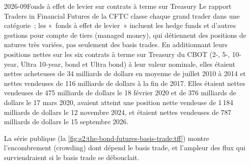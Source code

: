 \begin{dated}{2026-09}{Fonds à effet de levier sur contrats à terme sur Treasury}\label{dat:s2:the-bond-futures-basis-trade:tff}
Le rapport Traders in Financial Futures de la CFTC classe chaque grand trader dans une catégorie~; les «~fonds à effet de levier~» incluent les hedge funds et d'autres
gestions pour compte de tiers (managed money), qui détiennent des positions de natures très variées, pas seulement des basis trades. En additionnant leurs positions nettes sur les six contrats à terme sur Treasury du CBOT (2-, 5-, 10-year, Ultra
10-year, bond et Ultra bond) à leur valeur nominale, elles étaient nettes acheteuses de 34 milliards de dollars en moyenne de juillet 2010 à 2014 et nettes vendeuses de 116 milliards de dollars à la fin de
2017. Elles étaient nettes vendeuses de 475 milliards de dollars le 18 février 2020 et de 376 milliards de dollars le 17 mars 2020, avaient atteint une position nette vendeuse de 1\,184 milliards de dollars le 12 novembre
2024, et étaient nettes vendeuses de 787 milliards de dollars le 15 septembre 2026.
\end{dated}

La série publique (la \cref{fig:s2:the-bond-futures-basis-trade:tff}) montre l'encombrement (crowding) dont dépend le basis trade, et l'ampleur des flux qui
surviendraient si le basis trade se débouclait.

\begin{omfigure}

\label{fig:s2:the-bond-futures-basis-trade:tff}
\end{omfigure}

